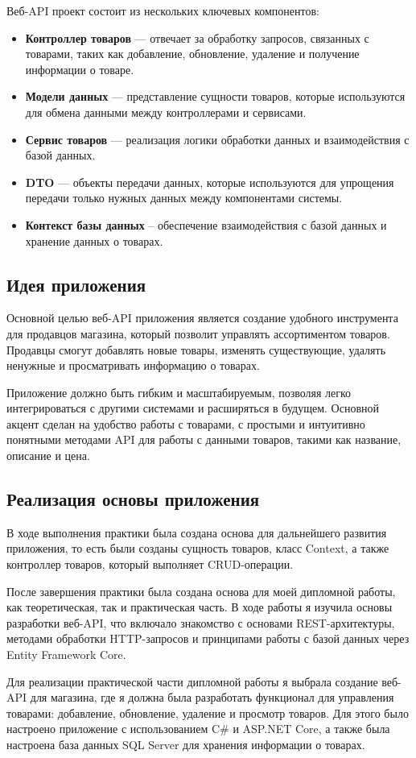 \documentclass[a4paper,12pt]{report}
\begin{document}
Веб-\ac{API} проект состоит из нескольких ключевых компонентов:
\begin{itemize}
  \item
  \textbf{Контроллер товаров} --- отвечает за обработку запросов, связанных с товарами, таких как добавление, обновление, удаление и получение информации о товаре.
  \item 
  \textbf{Модели данных} --- представление сущности товаров, которые используются для обмена данными между контроллерами и сервисами.
  \item
  \textbf{Сервис товаров} --- реализация логики обработки данных и взаимодействия с базой данных.
  \item
  \textbf{\ac{DTO}} --- объекты передачи данных, которые используются для упрощения передачи только нужных данных между компонентами системы.
  \item
  \textbf{Контекст базы данных} -- обеспечение взаимодействия с базой данных и хранение данных о товарах.
\end{itemize}

\subsection{Идея приложения}

Основной целью веб-\ac{API} приложения является создание удобного инструмента для продавцов магазина, 
который позволит управлять ассортиментом товаров. Продавцы смогут добавлять новые товары, 
изменять существующие, удалять ненужные и просматривать информацию о товарах.

Приложение должно быть гибким и масштабируемым, позволяя легко интегрироваться с другими системами и расширяться в будущем. 
Основной акцент сделан на удобство работы с товарами, с простыми и интуитивно понятными методами \ac{API} для работы с данными товаров, 
такими как название, описание и цена.

\subsection{Реализация основы приложения}

В ходе выполнения практики была создана основа для дальнейшего развития приложения, то есть были созданы сущность товаров, класс Context, 
а также контроллер товаров, который выполняет CRUD-операции.


После завершения практики была создана основа для моей дипломной работы, как теоретическая, так и практическая часть. 
В ходе работы я изучила основы разработки веб-\ac{API}, что включало знакомство с основами \ac{REST}-архитектуры, методами обработки 
\ac{HTTP}-запросов и принципами работы с базой данных через Entity Framework Core.

Для реализации практической части дипломной работы я выбрала создание веб-\ac{API} для магазина, где я должна была разработать 
функционал для управления товарами: добавление, обновление, удаление и просмотр товаров. Для этого было настроено приложение 
с использованием C\# и ASP.NET Core, а также была настроена база данных \ac{SQL} Server для хранения информации о товарах.

\newpage
{}
\end{document}
